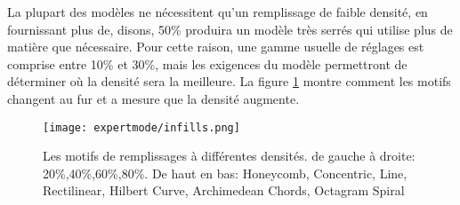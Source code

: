 La plupart des mod\`eles ne n\'ecessitent qu'un remplissage de faible densit\'e, en fournissant plus de, disons, 50\% produira un mod\`ele tr\`es serr\'es qui utilise plus de mati\`ere que n\'ecessaire. Pour cette raison, une gamme usuelle de r\'eglages est comprise entre 10\% et 30\%, mais les exigences du mod\`ele permettront de d\'eterminer o\`u la densit\'e sera la meilleure.  La figure \ref{fig:infill_pattern_densities} montre comment les motifs changent au fur et a mesure que la densit\'e augmente.
\begin{figure}[H]
\centering
\texttt{[image: expertmode/infills.png]}
\caption{ Les motifs de remplissages \`a diff\'erentes densit\'es. de gauche \`a droite: 20\%,40\%,60\%,80\%. De haut en bas: Honeycomb, Concentric, Line, Rectilinear, Hilbert Curve, Archimedean Chords, Octagram Spiral}
\label{fig:infill_pattern_densities}
\end{figure}

